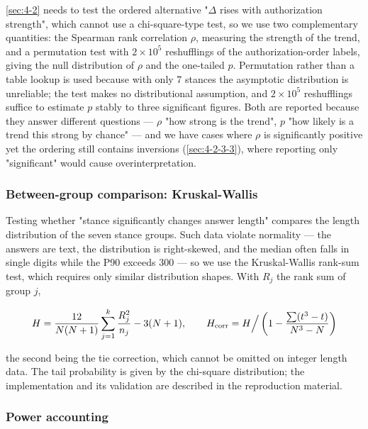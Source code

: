 \documentclass[pdflatex,sn-basic,Numbered]{sn-jnl}
\theoremstyle{thmstyleone}
\theoremstyle{thmstyletwo}
\theoremstyle{thmstylethree}
\begin{document}
\ref{sec:4-2} needs to test the ordered alternative "$\Delta$ rises with authorization strength", which
cannot use a chi-square-type test, so we use two complementary quantities: the Spearman rank
correlation $\rho$, measuring the strength of the trend, and a permutation test with
$2\times10^5$ reshufflings of the authorization-order labels, giving the null distribution of
$\rho$ and the one-tailed $p$. Permutation rather than a table lookup is used because with only
7 stances the asymptotic distribution is unreliable; the test makes no distributional
assumption, and $2\times10^5$ reshufflings suffice to estimate $p$ stably to three significant
figures. Both are reported because they answer different questions — $\rho$ "how strong is the
trend", $p$ "how likely is a trend this strong by chance" — and we have cases where $\rho$ is
significantly positive yet the ordering still contains inversions (\ref{sec:4-2-3-3}), where reporting
only "significant" would cause overinterpretation.

\subsubsection{Between-group comparison: Kruskal-Wallis}
\label{sec:4-5-3}

Testing whether "stance significantly changes answer length" compares the length distribution
of the seven stance groups. Such data violate normality — the answers are text, the distribution
is right-skewed, and the median often falls in single digits while the P90 exceeds 300 — so we
use the Kruskal-Wallis rank-sum test, which requires only similar distribution shapes. With
$R_j$ the rank sum of group $j$,

\begin{equation*}
  \resizebox{\ifdim\width>\linewidth \linewidth\else\width\fi}{!}{$\displaystyle H = \frac{12}{N(N+1)}\sum_{j=1}^{k} \frac{R_j^2}{n_j} - 3(N+1), \qquad H_{\text{corr}} = H \Big/ \left(1 - \frac{\sum (t^3 - t)}{N^3 - N}\right)$}
\end{equation*}

the second being the tie correction, which cannot be omitted on integer length data. The tail
probability is given by the chi-square distribution; the implementation and its validation are
described in the reproduction material.

\subsubsection{Power accounting}
\label{sec:4-5-4}
\end{document}
